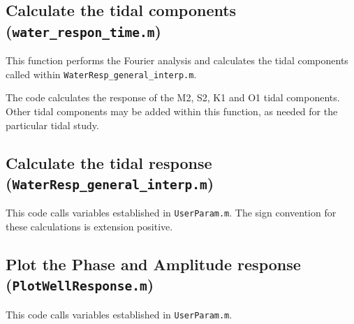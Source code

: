 \documentclass[11pt]{article}
\begin{document}
\subsection{Calculate the tidal components (\texttt{water\_respon\_time.m})}

This function performs the Fourier analysis and calculates the tidal components
called within \texttt{WaterResp\_general\_interp.m}.

The code calculates the response of the M2, S2, K1 and O1 tidal components.
Other tidal components may be added within this function, as needed for the
particular tidal study.



\subsection{Calculate the tidal response (\texttt{WaterResp\_general\_interp.m})}

This code calls variables established in \texttt{UserParam.m}.
The sign convention for these calculations is extension positive.

\subsection{Plot the Phase and Amplitude response (\texttt{PlotWellResponse.m})}

This code calls variables established in \texttt{UserParam.m}.
\end{document}
